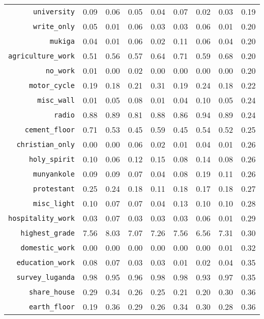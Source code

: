\begin{longtable}{rrrrrrrrr}
  {\texttt{university}} & 0.09 & 0.06 & 0.05 & 0.04 & 0.07 & 0.02 & 0.03 & 0.19 \\ 
  {\texttt{write\_only}} & 0.05 & 0.01 & 0.06 & 0.03 & 0.03 & 0.06 & 0.01 & 0.20 \\ 
  {\texttt{mukiga}} & 0.04 & 0.01 & 0.06 & 0.02 & 0.11 & 0.06 & 0.04 & 0.20 \\ 
  {\texttt{agriculture\_work}} & 0.51 & 0.56 & 0.57 & 0.64 & 0.71 & 0.59 & 0.68 & 0.20 \\ 
  {\texttt{no\_work}} & 0.01 & 0.00 & 0.02 & 0.00 & 0.00 & 0.00 & 0.00 & 0.20 \\ 
  {\texttt{motor\_cycle}} & 0.19 & 0.18 & 0.21 & 0.31 & 0.19 & 0.24 & 0.18 & 0.22 \\ 
  {\texttt{misc\_wall}} & 0.01 & 0.05 & 0.08 & 0.01 & 0.04 & 0.10 & 0.05 & 0.24 \\ 
  {\texttt{radio}} & 0.88 & 0.89 & 0.81 & 0.88 & 0.86 & 0.94 & 0.89 & 0.24 \\ 
  {\texttt{cement\_floor}} & 0.71 & 0.53 & 0.45 & 0.59 & 0.45 & 0.54 & 0.52 & 0.25 \\ 
  {\texttt{christian\_only}} & 0.00 & 0.00 & 0.06 & 0.02 & 0.01 & 0.04 & 0.01 & 0.26 \\ 
  {\texttt{holy\_spirit}} & 0.10 & 0.06 & 0.12 & 0.15 & 0.08 & 0.14 & 0.08 & 0.26 \\ 
  {\texttt{munyankole}} & 0.09 & 0.09 & 0.07 & 0.04 & 0.08 & 0.19 & 0.11 & 0.26 \\ 
  {\texttt{protestant}} & 0.25 & 0.24 & 0.18 & 0.11 & 0.18 & 0.17 & 0.18 & 0.27 \\ 
  {\texttt{misc\_light}} & 0.10 & 0.07 & 0.07 & 0.04 & 0.13 & 0.10 & 0.10 & 0.28 \\ 
  {\texttt{hospitality\_work}} & 0.03 & 0.07 & 0.03 & 0.03 & 0.03 & 0.06 & 0.01 & 0.29 \\ 
  {\texttt{highest\_grade}} & 7.56 & 8.03 & 7.07 & 7.26 & 7.56 & 6.56 & 7.31 & 0.30 \\ 
  {\texttt{domestic\_work}} & 0.00 & 0.00 & 0.00 & 0.00 & 0.00 & 0.00 & 0.01 & 0.32 \\ 
  {\texttt{education\_work}} & 0.08 & 0.07 & 0.03 & 0.03 & 0.01 & 0.02 & 0.04 & 0.35 \\ 
  {\texttt{survey\_luganda}} & 0.98 & 0.95 & 0.96 & 0.98 & 0.98 & 0.93 & 0.97 & 0.35 \\ 
  {\texttt{share\_house}} & 0.29 & 0.34 & 0.26 & 0.25 & 0.21 & 0.20 & 0.30 & 0.36 \\ 
  {\texttt{earth\_floor}} & 0.19 & 0.36 & 0.29 & 0.26 & 0.34 & 0.30 & 0.28 & 0.36 \\ 

\end{longtable}
